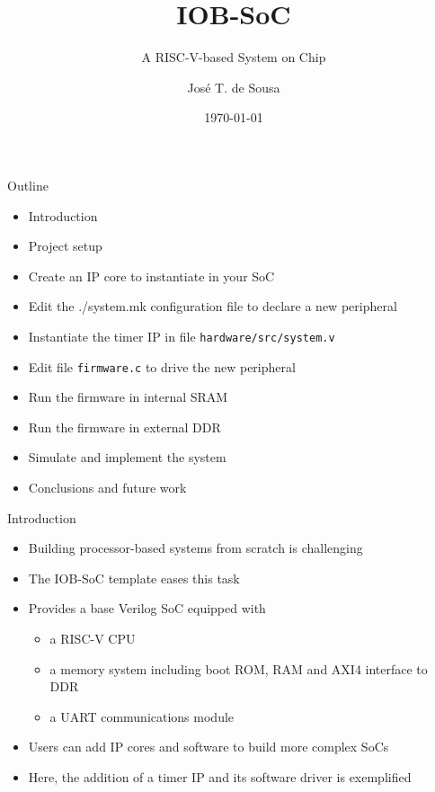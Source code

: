 \documentclass [xcolor=svgnames, t] {beamer}
\title[IOB-SoC Presentation]{IOB-SoC}
\subtitle{A RISC-V-based System on Chip}
\institute[IObundle Lda]{IObundle Lda.\\The Architecture for an Agile World}
\author[José T. de Sousa]{Jos\'e T. de Sousa}
\institute[IObundle Lda]{IObundle Lda}
\date{\today}
\begin{document}
\begin{frame}
 \titlepage   
\end{frame}


\begin{frame}{Outline}
\begin{center}
   \begin{itemize}
     \item Introduction
     \item Project setup
     \item Create an IP core to instantiate in your SoC
     \item Edit the ./system.mk configuration file to declare a new peripheral
     \item Instantiate the timer IP in file {\tt hardware/src/system.v}
     \item Edit file {\tt firmware.c} to drive the new peripheral
     \item Run the firmware in internal SRAM
     \item Run the firmware in external DDR
     \item Simulate and implement the system
     \item Conclusions and future work
 \end{itemize} 
\end{center}
\end{frame}


\begin{frame}{Introduction}
\begin{center}
    \begin{itemize}
      \item Building processor-based systems from scratch is challenging
      \item The IOB-SoC template eases this task
      \item Provides a base Verilog SoC equipped with
        \begin{itemize}
        \item a RISC-V CPU
        \item a memory system including boot ROM, RAM and AXI4 interface to DDR
        \item a UART communications module
        \end{itemize}
      \item Users can add IP cores and software to build more complex SoCs
      \item Here, the addition of a timer IP and its software driver is exemplified
    \end{itemize}
\end{center}
\end{frame}
\end{document}
